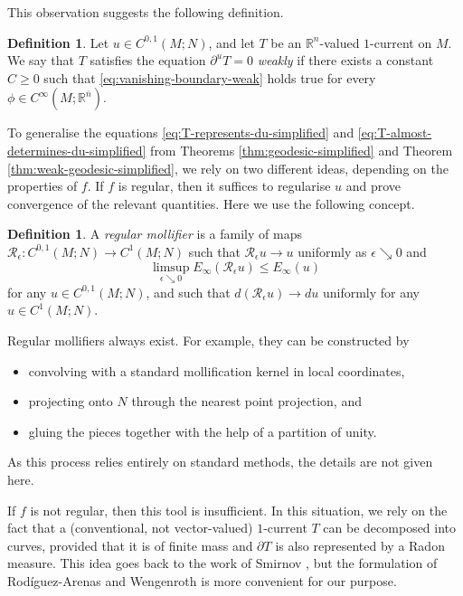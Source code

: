 \documentclass[a4paper]{article}
\newcommand{\R}{\mathbb{R}}
\newcommand{\ndim}{{\bar{n}}}
\theoremstyle{definition}
\newtheorem{definition}[theorem]{Definition}
\theoremstyle{remark}
\begin{document}
This observation suggests the following definition.

\begin{definition} \label{def:u-boundary}
Let $u \in C^{0, 1}(M; N)$, and let $T$ be an $\R^n$-valued $1$-current on $M$. We say that $T$ satisfies the equation $\partial^u T = 0$ \emph{weakly} if there exists a constant $C \ge 0$ such that \eqref{eq:vanishing-boundary-weak} holds true
for every $\phi \in C^\infty(M; \R^\ndim)$.
\end{definition}

To generalise the  equations \eqref{eq:T-represents-du-simplified} and \eqref{eq:T-almost-determines-du-simplified}
from Theorems \ref{thm:geodesic-simplified} and Theorem \ref{thm:weak-geodesic-simplified},
we rely on two different ideas, depending on the properties of $f$.
If $f$ is regular, then it suffices to regularise $u$ and prove convergence of the relevant quantities. Here we use the following concept.

\begin{definition}
A \emph{regular mollifier} is a family of maps $\mathcal{R}_\epsilon \colon C^{0, 1}(M; N) \to C^1(M; N)$ such that $\mathcal{R}_\epsilon u \to u$ uniformly
as $\epsilon \searrow 0$ and
\[
\limsup_{\epsilon \searrow 0} E_\infty(\mathcal{R}_\epsilon u) \le E_\infty(u)
\]
for any $u \in C^{0, 1}(M; N)$, and such that $d(\mathcal{R_\epsilon} u) \to du$
uniformly for any $u \in C^1(M; N)$.
\end{definition}

Regular mollifiers always exist. For example, they can be constructed by
\begin{itemize}
\item convolving with a standard mollification kernel in local coordinates,
\item projecting onto $N$ through the nearest point projection, and
\item gluing the pieces together with the help of a partition of unity.
\end{itemize}
As this process relies entirely on standard methods, the details are not given here.

If $f$ is not regular, then this tool is insufficient. In this situation,
we rely on the fact that a (conventional, not vector-valued) $1$-current $T$
can be decomposed into curves, provided that it is of finite mass and $\partial T$ is also represented by a Radon measure.
This idea goes back to the work of Smirnov \cite{Smirnov:93}, but the formulation of
Rod\'iguez-Arenas and Wengenroth \cite{Rodriguez-Arenas-Wengenroth:24} is more convenient for our purpose.
\end{document}
